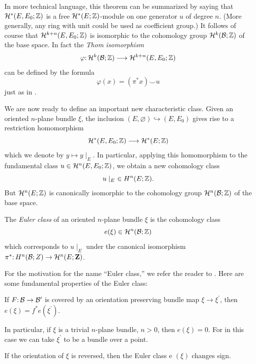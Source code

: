 In more technical language, this theorem can be summarized by saying that $\mathcal{H}^{*}(E, E_{0} ; \mathbb{Z})$ is a free $\mathcal{H}^{*}(E ; \mathbb{Z})$-module on one generator $u$ of degree $n$. (More generally, any ring with unit could be used as coefficient group.) It follows of course that $\mathcal{H}^{k+ n }(E, E_{0} ; \mathbb{Z})$ is isomorphic to the cohomology group $\mathcal{H}^{k}(\mathcal{B} ; \mathbb{Z})$ of the base space. In fact the \textit{Thom isomorphism}
\[
\map{\varphi}{\homology^{k}(\B ; \Z)}{\homology^{k+ n }(E, E_{0} ; \Z)}\]
can be defined by the formula
\[
\varphi(x)=(\pi^{*} x) \smile u
\]
just as in .

We are now ready to define an important new characteristic class. Given an oriented $n$-plane bundle $\xi$, the inclusion $(E, \varnothing) \hookrightarrow(E, E_{0})$ gives rise to a restriction homomorphism 
\[
\mathcal{H}^{*}(E, E_{0} ; \mathbb{Z}) \longrightarrow \mathcal{H}^{*}(E ; \mathbb{Z})
\]
which we denote by $ y  \mapsto  y  \mid _{E}$. In particular, applying this homomorphism to the fundamental class $u \in \mathcal{H}^{ n }(E, E_{0} ; \mathbb{Z})$, we obtain a new cohomology class
\[
u \mid _{E}\ \in H^{n}(E ; \Z).
\]
But $\mathcal{H}^{ n }(E ; \mathbb{Z})$ is canonically isomorphic to the cohomology group $\mathcal{H}^{ n }(\mathcal{B} ; \mathbb{Z})$ of the base space.

\begin{definition}\label{def:9-3}
	The \textit{Euler class} of an oriented $n$-plane bundle $\xi$ is the cohomology class
	\[
	e(\xi) \in \mathcal{H}^{ n }(\mathcal{B} ; \mathbb{Z})
	\]
	which corresponds to $u \mid _{E}$ under the canonical isomorphism $\map{\pi^{*}}{H^{n}(\B ; Z)}{\homology^{ n }(E ; \mathbf{Z})}$.
\end{definition}

For the motivation for the name ``Euler class,'' we refer the reader to . Here are some fundamental properties of the Euler class:
\begin{property}[Naturality]\label{property-9-2}
	If $\map{F}{\B}{\B^{\prime}}$ is covered by an orientation preserving bundle map $\xi \rightarrow \xi^{\prime}$, then $e(\xi)=f^{*} e(\xi^{\prime})$.
\end{property}

In particular, if $\xi$ is a trivial $n$-plane bundle, $n>0$, then $e(\xi)=0$. For in this case we can take $\xi^{\prime}$ to be a bundle over a point.

\begin{property}[Naturality]\label{property-9-3}
If the orientation of $\xi$ is reversed, then the Euler class e $(\xi)$ changes sign.
\end{property}

